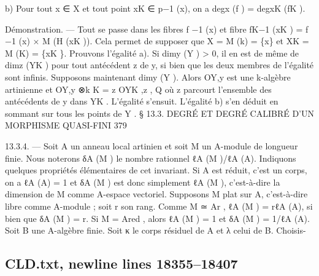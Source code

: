 \documentclass[
  10pt,
]{article}
\newenvironment{Shaded}{}{}
\newcommand{\NormalTok}[1]{#1}
\begin{document}
\begin{Shaded}
\begin{Highlighting}[]
\NormalTok{  b) Pour tout x ∈ X et tout point xK ∈ p−1 (x), on a degx (f ) = degxK (fK ).}

\NormalTok{Démonstration. — Tout se passe dans les fibres f −1 (x) et fibre fK−1 (xK ) = f −1 (x) ×}
\NormalTok{M (H (xK )). Cela permet de supposer que X = M (k) = \{x\} et XK = M (K) = \{xK \}.}
\NormalTok{  Prouvons l’égalité a). Si dimy (Y ) \textgreater{} 0, il en est de même de dimz (YK ) pour tout}
\NormalTok{antécédent z de y, si bien que les deux membres de l’égalité sont infinis. Supposons}
\NormalTok{maintenant dimy (Y ). Alors OY,y est une k{-}algèbre artinienne et OY,y ⊗k K = z OYK ,z ,}
\NormalTok{                                                                              Q}
\NormalTok{où z parcourt l’ensemble des antécédents de y dans YK . L’égalité s’ensuit.}
\NormalTok{  L’égalité b) s’en déduit en sommant sur tous les points de Y .}
\NormalTok{               § 13.3. DEGRÉ ET DEGRÉ CALIBRÉ D’UN MORPHISME QUASI{-}FINI                    379}

\NormalTok{13.3.4. — Soit A un anneau local artinien et soit M un A{-}module de longueur finie.}
\NormalTok{Nous noterons δA (M ) le nombre rationnel ℓA (M )/ℓA (A). Indiquons quelques propriétés}
\NormalTok{élémentaires de cet invariant.}
\NormalTok{   Si A est réduit, c’est un corps, on a ℓA (A) = 1 et δA (M ) est donc simplement ℓA (M ),}
\NormalTok{c’est{-}à{-}dire la dimension de M comme A{-}espace vectoriel.}
\NormalTok{   Supposons M plat sur A, c’est{-}à{-}dire libre comme A{-}module ; soit r son rang. Comme}
\NormalTok{M ≃ Ar , ℓA (M ) = rℓA (A), si bien que δA (M ) = r.}
\NormalTok{   Si M = Ared , alors ℓA (M ) = 1 et δA (M ) = 1/ℓA (A).}
\NormalTok{   Soit B une A{-}algèbre finie. Soit κ le corps résiduel de A et λ celui de B. Choisis{-}}
\end{Highlighting}
\end{Shaded}

\subsection{CLD.txt, newline lines
18355--18407}\label{cld.txt-newline-lines-1835518407}
\end{document}
